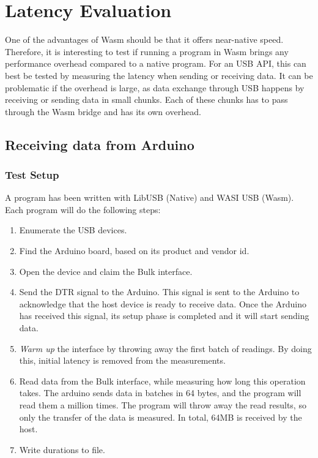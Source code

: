 \section{Latency Evaluation}

One of the advantages of \acrshort{Wasm} should be that it offers near-native speed. Therefore, it is interesting to test if running a program in Wasm brings any performance overhead compared to a native program. For an USB API, this can best be tested by measuring the latency when sending or receiving data. It can be problematic if the overhead is large, as data exchange through USB happens by receiving or sending data in small chunks. Each of these chunks has to pass through the Wasm bridge and has its own overhead.

\subsection{Receiving data from Arduino}

\subsubsection{Test Setup}
A program has been written with LibUSB (Native) and WASI USB (Wasm). Each program will do the following steps:

\begin{enumerate}
\item Enumerate the USB devices.
\item Find the Arduino board, based on its product and vendor id.
\item Open the device and claim the Bulk interface.
\item Send the \acrfull{DTR} signal to the Arduino. This signal is sent to the Arduino to acknowledge that the host device is ready to receive data. Once the Arduino has received this signal, its setup phase is completed and it will start sending data.
\item \textit{Warm up } the interface by throwing away the first batch of readings. By doing this, initial latency is removed from the measurements.
\item Read data from the Bulk interface, while measuring how long this operation takes. The arduino sends data in batches in 64 bytes, and the program will read them a million times. The program will throw away the read results, so only the transfer of the data is measured. In total, 64MB is received by the host.
\item Write durations to file.
\end{enumerate}

